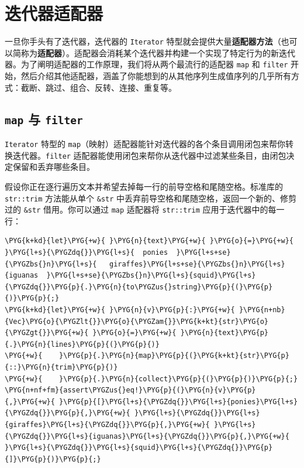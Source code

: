 \section{迭代器适配器}

一旦你手头有了迭代器，迭代器的 \texttt{Iterator} 特型就会提供大量\textbf{适配器方法}（也可以简称为\textbf{适配器}）。适配器会消耗某个迭代器并构建一个实现了特定行为的新迭代器。为了阐明适配器的工作原理，我们将从两个最流行的适配器 \texttt{map} 和 \texttt{filter} 开始，然后介绍其他适配器，涵盖了你能想到的从其他序列生成值序列的几乎所有方式：截断、跳过、组合、反转、连接、重复等。

\subsection{\texttt{map} 与 \texttt{filter}}

\texttt{Iterator} 特型的 \texttt{map}（映射）适配器能针对迭代器的各个条目调用闭包来帮你转换迭代器。\texttt{filter} 适配器能使用闭包来帮你从迭代器中过滤某些条目，由闭包决定保留和丢弃哪些条目。

假设你正在逐行遍历文本并希望去掉每一行的前导空格和尾随空格。标准库的 \texttt{str::trim} 方法能从单个 \texttt{\&str} 中丢弃前导空格和尾随空格，返回一个新的、修剪过的 \texttt{\&str} 借用。你可以通过 \texttt{map} 适配器将 \texttt{str::trim} 应用于迭代器中的每一行：

\begin{Verbatim}[commandchars=\\\{\},breaklines=true,breakanywhere=true,fontsize=\codefont,xleftmargin=17bp]
\PYG{k+kd}{let}\PYG{+w}{ }\PYG{n}{text}\PYG{+w}{ }\PYG{o}{=}\PYG{+w}{ }\PYG{l+s}{\PYGZdq{}}\PYG{l+s}{  ponies  }\PYG{l+s+se}{\PYGZbs{}n}\PYG{l+s}{   giraffes}\PYG{l+s+se}{\PYGZbs{}n}\PYG{l+s}{iguanas  }\PYG{l+s+se}{\PYGZbs{}n}\PYG{l+s}{squid}\PYG{l+s}{\PYGZdq{}}\PYG{p}{.}\PYG{n}{to\PYGZus{}string}\PYG{p}{(}\PYG{p}{)}\PYG{p}{;}
\PYG{k+kd}{let}\PYG{+w}{ }\PYG{n}{v}\PYG{p}{:}\PYG{+w}{ }\PYG{n+nb}{Vec}\PYG{o}{\PYGZlt{}}\PYG{o}{\PYGZam{}}\PYG{k+kt}{str}\PYG{o}{\PYGZgt{}}\PYG{+w}{ }\PYG{o}{=}\PYG{+w}{ }\PYG{n}{text}\PYG{p}{.}\PYG{n}{lines}\PYG{p}{(}\PYG{p}{)}
\PYG{+w}{    }\PYG{p}{.}\PYG{n}{map}\PYG{p}{(}\PYG{k+kt}{str}\PYG{p}{::}\PYG{n}{trim}\PYG{p}{)}
\PYG{+w}{    }\PYG{p}{.}\PYG{n}{collect}\PYG{p}{(}\PYG{p}{)}\PYG{p}{;}
\PYG{n+nf+fm}{assert\PYGZus{}eq!}\PYG{p}{(}\PYG{n}{v}\PYG{p}{,}\PYG{+w}{ }\PYG{p}{[}\PYG{l+s}{\PYGZdq{}}\PYG{l+s}{ponies}\PYG{l+s}{\PYGZdq{}}\PYG{p}{,}\PYG{+w}{ }\PYG{l+s}{\PYGZdq{}}\PYG{l+s}{giraffes}\PYG{l+s}{\PYGZdq{}}\PYG{p}{,}\PYG{+w}{ }\PYG{l+s}{\PYGZdq{}}\PYG{l+s}{iguanas}\PYG{l+s}{\PYGZdq{}}\PYG{p}{,}\PYG{+w}{ }\PYG{l+s}{\PYGZdq{}}\PYG{l+s}{squid}\PYG{l+s}{\PYGZdq{}}\PYG{p}{]}\PYG{p}{)}\PYG{p}{;}
\end{Verbatim}

